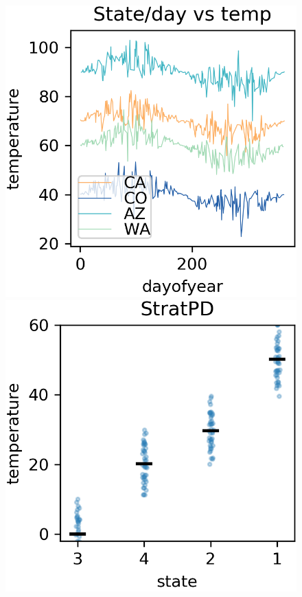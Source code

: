 \documentclass[12pt]{article}
\begin{document}
\begin{figure}[htbp]
\begin{center}
\includegraphics[scale=0.7]{images/dayofyear_vs_temp.png}
\includegraphics[scale=0.7]{images/state_vs_temp_stratpd.png}

\end{center}
\end{figure}
\end{document}
